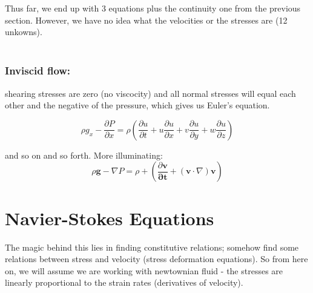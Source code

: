 \documentclass[10pt,a4paper,draft]{article}
\begin{document}
Thus far, we end up with 3 equations plus the continuity one from the previous section.
However, we have no idea what the velocities or the stresses are (12 unkowns). 
\\~\\

\subsubsection{Inviscid flow:} 
shearing stresses are zero (no viscocity) and all normal stresses will equal each other and the negative of the pressure, which gives us Euler's equation. 

$$
\rho g_x - \frac{\partial P}{\partial x} 
= \rho
\left(
	\frac{\partial u}{\partial t} 
+ u \frac{\partial u}{\partial x}
+ v \frac{\partial u}{\partial y}
+ w \frac{\partial u}{\partial z}
\right)
$$

and so on and so forth.
More illuminating: 
$$
\rho \mathbf{g} - \nabla P 
= \rho + \left( 
	\frac{\partial \mathbf{v}}{\mathbf{\partial t}}
	+ \left(\mathbf{v} \cdot \nabla \right) \mathbf{v}
\right) 
$$



\section{Navier-Stokes Equations}
The magic behind this lies in finding constitutive relations; somehow find some relations between stress and velocity (stress deformation equations).
So from here on, we will assume we are working with newtownian fluid - the stresses are linearly proportional to the strain rates (derivatives of velocity).
\end{document}

